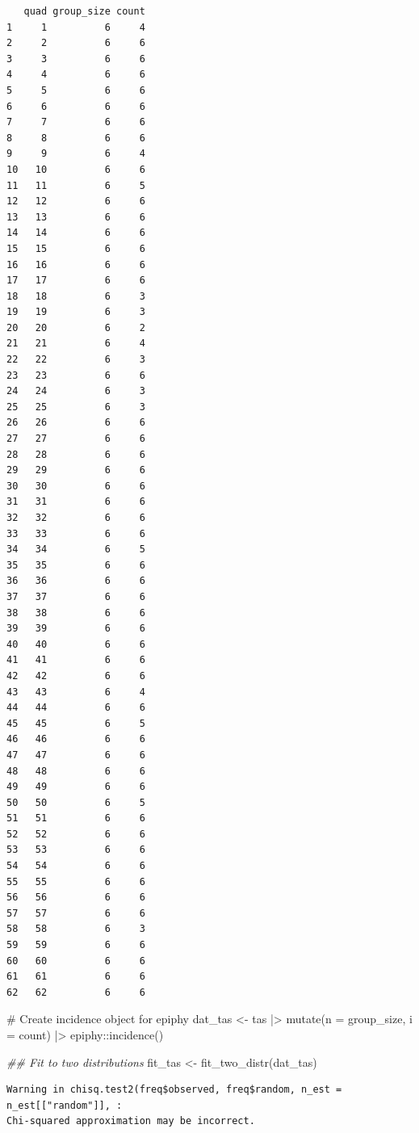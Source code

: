 \documentclass[
  letterpaper,
  DIV=11,
  numbers=noendperiod]{scrreprt}
\newenvironment{Shaded}{\begin{snugshade}}{\end{snugshade}}
\newcommand{\AttributeTok}[1]{\textcolor[rgb]{0.40,0.45,0.13}{#1}}
\newcommand{\CommentTok}[1]{\textcolor[rgb]{0.37,0.37,0.37}{#1}}
\newcommand{\DocumentationTok}[1]{\textcolor[rgb]{0.37,0.37,0.37}{\textit{#1}}}
\newcommand{\FunctionTok}[1]{\textcolor[rgb]{0.28,0.35,0.67}{#1}}
\newcommand{\NormalTok}[1]{\textcolor[rgb]{0.00,0.23,0.31}{#1}}
\newcommand{\OtherTok}[1]{\textcolor[rgb]{0.00,0.23,0.31}{#1}}
\newcommand{\SpecialCharTok}[1]{\textcolor[rgb]{0.37,0.37,0.37}{#1}}
\begin{document}
\begin{verbatim}
   quad group_size count
1     1          6     4
2     2          6     6
3     3          6     6
4     4          6     6
5     5          6     6
6     6          6     6
7     7          6     6
8     8          6     6
9     9          6     4
10   10          6     6
11   11          6     5
12   12          6     6
13   13          6     6
14   14          6     6
15   15          6     6
16   16          6     6
17   17          6     6
18   18          6     3
19   19          6     3
20   20          6     2
21   21          6     4
22   22          6     3
23   23          6     6
24   24          6     3
25   25          6     3
26   26          6     6
27   27          6     6
28   28          6     6
29   29          6     6
30   30          6     6
31   31          6     6
32   32          6     6
33   33          6     6
34   34          6     5
35   35          6     6
36   36          6     6
37   37          6     6
38   38          6     6
39   39          6     6
40   40          6     6
41   41          6     6
42   42          6     6
43   43          6     4
44   44          6     6
45   45          6     5
46   46          6     6
47   47          6     6
48   48          6     6
49   49          6     6
50   50          6     5
51   51          6     6
52   52          6     6
53   53          6     6
54   54          6     6
55   55          6     6
56   56          6     6
57   57          6     6
58   58          6     3
59   59          6     6
60   60          6     6
61   61          6     6
62   62          6     6
\end{verbatim}

\begin{Shaded}
\begin{Highlighting}[]
\CommentTok{\# Create incidence object for epiphy}
\NormalTok{dat\_tas }\OtherTok{\textless{}{-}}\NormalTok{ tas }\SpecialCharTok{|\textgreater{}}
  \FunctionTok{mutate}\NormalTok{(}\AttributeTok{n =}\NormalTok{ group\_size, }\AttributeTok{i =}\NormalTok{ count) }\SpecialCharTok{|\textgreater{}}
\NormalTok{  epiphy}\SpecialCharTok{::}\FunctionTok{incidence}\NormalTok{()}

\DocumentationTok{\#\# Fit to two distributions}
\NormalTok{fit\_tas }\OtherTok{\textless{}{-}} \FunctionTok{fit\_two\_distr}\NormalTok{(dat\_tas)}
\end{Highlighting}
\end{Shaded}

\begin{verbatim}
Warning in chisq.test2(freq$observed, freq$random, n_est = n_est[["random"]], :
Chi-squared approximation may be incorrect.
\end{verbatim}
\end{document}
